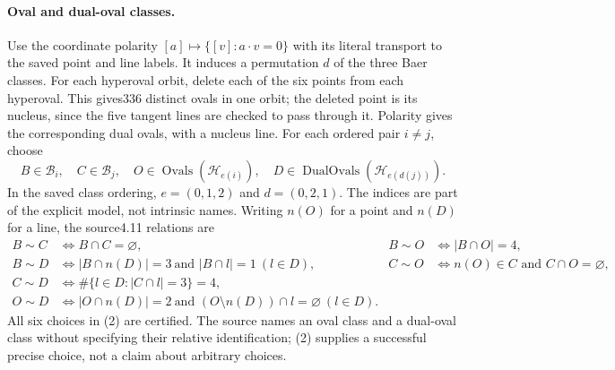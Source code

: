 \documentclass[11pt]{article}
\newcommand{\orb}{\mathcal B}\newcommand{\hyp}{\mathcal H}
\begin{document}
\paragraph{Oval and dual-oval classes.}
Use the coordinate polarity $[a]\mapsto\{[v]:a\cdot v=0\}$ with its
literal transport to the saved point and line labels. It induces a permutation
$d$ of the three Baer classes. For each hyperoval orbit, delete each of the
six points from each hyperoval. This gives336 distinct ovals in one orbit;
the deleted point is its nucleus, since the five tangent lines are checked
to pass through it. Polarity gives the corresponding dual ovals, with a
nucleus line. For each ordered pair $i\ne j$, choose
\[
 B\in\orb_i,\quad C\in\orb_j,\quad
 O\in\operatorname{Ovals}(\hyp_{e(i)}),\quad
 D\in\operatorname{DualOvals}(\hyp_{e(d(j))}).             \tag{2}
\]
In the saved class ordering, $e=(0,1,2)$ and $d=(0,2,1)$.
The indices are part of the explicit model, not intrinsic names.
Writing $n(O)$ for a point and $n(D)$ for a line, the source4.11 relations are
\begin{align*}
 B\sim C&\iff B\cap C=\varnothing,&
 B\sim O&\iff |B\cap O|=4,\\
 B\sim D&\iff |B\cap n(D)|=3\ \text{and }|B\cap l|=1\ (l\in D),&
 C\sim O&\iff n(O)\in C\text{ and }C\cap O=\varnothing,\\
 C\sim D&\iff \#\{l\in D:|C\cap l|=3\}=4,\\
 O\sim D&\iff |O\cap n(D)|=2\ \text{and }(O\setminus n(D))\cap l=\varnothing\ (l\in D).
\end{align*}
All six choices in (2) are certified. The source names an oval class and
a dual-oval class without specifying their relative identification; (2)
supplies a successful precise choice, not a claim about arbitrary choices.
\end{document}
